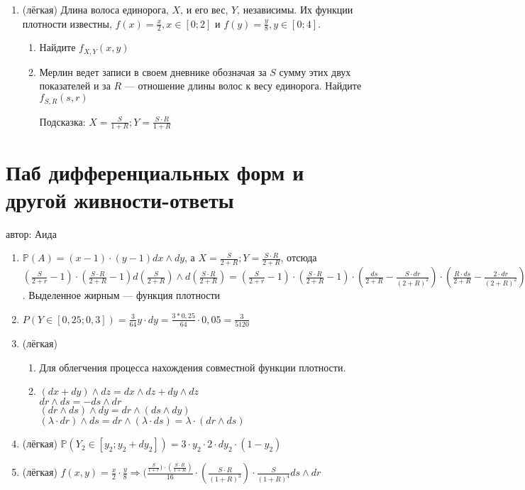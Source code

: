 \documentclass[a4paper,12pt]{article}
\def \P{\mathbb{P}}
\begin{document}
\begin{enumerate}
В конце недели они составляют рейтинг результатов, $Y_i$ – это место в рейтинге по возрастанию,то есть $Y_1$ – это место рыцаря, которые проехал меньше всего. Найдите $\P(Y_2 \in [y_2;y_2+dy_2])$ с точностью до $o(\Delta)$.
\item (лёгкая) Длина волоса единорога, $X$, и его вес, $Y$, независимы. Их функции плотности известны, $f(x)=\frac{x}{2}, x \in [0;2]$ и $f(y)=\frac{y}{8}, y \in [0;4]$.

\begin{enumerate}
\item Найдите $f_{X,Y}(x,y)$
\item Мерлин ведет записи в своем дневнике обозначая за $S$ сумму этих двух показателей и за $R$ — отношение длины волос к весу единорога. Найдите $f_{S,R}(s,r)$

Подсказка: $X=\frac{S}{1+R}; Y=\frac{S\cdot R}{1+R}$
\end{enumerate}

\end{enumerate}

\newpage
\section{Паб дифференциальных форм и другой живности-ответы}
автор: Аида

\begin{enumerate}
\item $\P(A)=(x-1)\cdot(y-1)dx\wedge dy$, а $X=\frac{S}{2+R}; Y=\frac{S\cdot R}{2+R}$, отсюда  $(\frac{S}{2+r}-1)\cdot (\frac{S\cdot R}{2+R}-1) d(\frac{S}{2+R}) \wedge d(\frac{S\cdot R}{2+R})=(\frac{S}{2+r}-1)\cdot (\frac{S\cdot R}{2+R}-1)\cdot(\frac{ds}{2+R}-\frac{S\cdot dr}{(2+R)^2})\cdot (\frac{R\cdot ds}{2+R}-\frac{2\cdot dr}{(2+R)^2})= \mathbf{(\frac{S}{2+r}-1)\cdot (\frac{S\cdot R}{2+R}-1) \cdot (\frac{S\cdot R-2}{(2+R)^3})}\cdot ds\wedge dr$. Выделенное жирным — функция плотности
\item
$P(Y \in [0,25;0,3])= \frac{3}{64}y \cdot dy = \frac{3*0,25}{64} \cdot 0,05= \frac{3}{5120}$

\item (лёгкая)
\begin{enumerate}
\item Для облегчения процесса нахождения совместной функции плотности.
\item $(dx+dy)\wedge dz=dx\wedge dz + dy\wedge dz$
\\ $dr\wedge ds= - ds\wedge dr $ \\ $(dr\wedge ds) \wedge dy =dr\wedge (ds \wedge dy)$ \\  $(\lambda \cdot dr) \wedge ds = dr \wedge (\lambda \cdot ds)= \lambda \cdot ( dr \wedge ds)$
\end{enumerate}
\item (лёгкая) $\P(Y_2 \in [y_2;y_2+dy_2])=3\cdot y_2 \cdot 2 \cdot dy_2 \cdot (1-y_2)$
\item (лёгкая) $f(x,y)=\frac{x}{2} \cdot \frac{y}{8}\Rightarrow (\frac{\frac{S}{1+r})\cdot (\frac{S\cdot R}{1+R})}{16} \cdot (\frac{S\cdot R}{(1+R)^3})\cdot \frac{S}{(1+R)^4} ds\wedge dr$
\end{enumerate}
\end{document}
